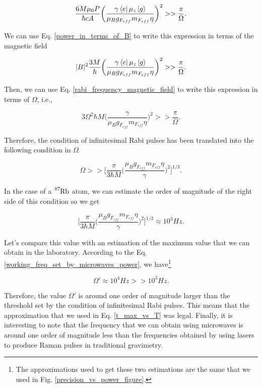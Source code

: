 \documentclass{article}
\begin{document}
\begin{equation}
    \frac{6 M \mu_{0} P}{\hbar c A} \bigg(\frac{ \gamma  \bra{e} \mu_{z} \ket{g}}{\mu_{B} g_{F_{eff}} m_{F_{eff}} \eta}\bigg)^{2} >> \frac{\pi}{\Omega}.
\end{equation}

We can use Eq. \ref{power_in_terms_of_B} to write this expression in terms of the magnetic field

\begin{equation}
   |B|^{2}\frac{3 M }{\hbar} \bigg(\frac{ \gamma  \bra{e} \mu_{z} \ket{g}}{\mu_{B} g_{F_{eff}} m_{F_{eff}} \eta}\bigg)^{2} >> \frac{\pi}{\Omega}.
\end{equation}

Then, we can use Eq. \ref{rabi_frequency_magnetic_field} to write this expression in terms of $\Omega$, i.e.,

\begin{equation}
   3 \Omega^{2} \hbar M \bigg(\frac{ \gamma}{\mu_{B} g_{F_{eff}} m_{F_{eff}} \eta}\bigg)^{2} >> \frac{\pi}{\Omega}.
\end{equation}

Therefore, the condition of infinitesimal Rabi pulses has been translated into the following condition in $\Omega$

\begin{equation}
    \Omega  >> \Bigg[ \frac{\pi}{3 \hbar M} \bigg(\frac{\mu_{B} g_{F_{eff}} m_{F_{eff}} \eta}{\gamma}\bigg)^{2} \Bigg]^{1/3}.
\end{equation}

In the case of a $\ce{^{87}_{}Rb}$ atom, we can estimate the order of magnitude of the right side of this condition so we get

\begin{equation}
    \Bigg[ \frac{\pi}{3 \hbar M} \bigg(\frac{\mu_{B} g_{F_{eff}} m_{F_{eff}} \eta}{\gamma}\bigg)^{2} \Bigg]^{1/3} \approx 10^{3} Hz.
\end{equation}

Let's compare this value with an estimation of the maximum value that we can obtain in the laboratory. According to the Eq. \ref{working_freq_set_by_microwaves_power},  we have\footnote{The approximations used to get these two estimations are the same that we used in Fig. \ref{precision_vs_power_figure}.}

\begin{equation}
    \Omega' \approx 10^{4} Hz  >> 10^{3} Hz.
\end{equation}

Therefore, the value $\Omega'$ is around one order of magnitude larger than the threshold set by the condition of infinitesimal Rabi pulses. This means that the approximation that we used in Eq. \ref{t_max_vs_T} was legal. Finally, it is interesting to note that the frequency that we can obtain using microwaves is around one order of magnitude less than the frequencies obtained by using lasers to produce Raman pulses in traditional gravimetry.
\end{document}

